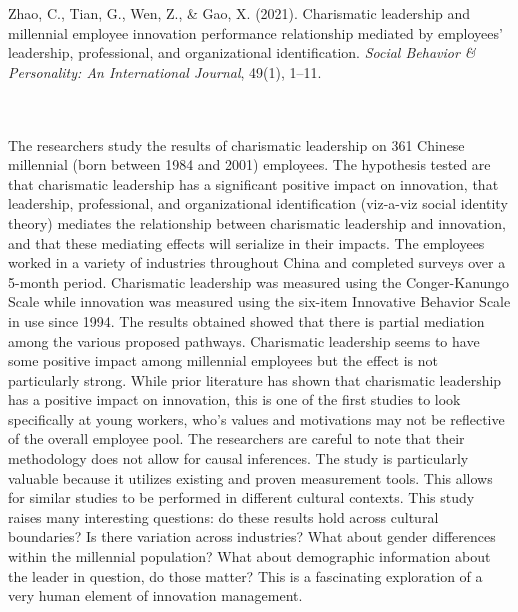 \documentclass{apa7}
\begin{document}
\bigskip
\hfill\begin{minipage}{\dimexpr\textwidth-1in}
  \begin{hangparas}{.25in}{1}
Zhao, C., Tian, G., Wen, Z., \& Gao, X. (2021). Charismatic leadership and millennial employee innovation performance relationship mediated by employees’ leadership, professional, and organizational identification. \textit{Social Behavior \& Personality: An International Journal}, 49(1), 1–11.
\end{hangparas}
\xdef\tpd{\the\prevdepth}
\end{minipage}
\\
\\
The researchers study the results of charismatic leadership on 361 Chinese millennial (born between 1984 and 2001) employees. The hypothesis tested are that charismatic leadership has a significant positive impact on innovation, that leadership, professional, and organizational identification (viz-a-viz social identity theory) mediates the relationship between charismatic leadership and innovation, and that these mediating effects will serialize in their impacts. The employees worked in a variety of industries throughout China and completed surveys over a 5-month period. Charismatic leadership was measured using the Conger-Kanungo Scale while innovation was measured using the six-item Innovative Behavior Scale in use since 1994. The results obtained showed that there is partial mediation among the various proposed pathways. Charismatic leadership seems to have some positive impact among millennial employees but the effect is not particularly strong.  While prior literature has shown that charismatic leadership has a positive impact on innovation, this is one of the first studies to look specifically at young workers, who's values and motivations may not be reflective of the overall employee pool. The researchers are careful to note that their methodology does not allow for causal inferences. The study is particularly valuable because it utilizes existing and proven measurement tools. This allows for similar studies to be performed in different cultural contexts. This study raises many interesting questions: do these results hold across cultural boundaries? Is there variation across industries? What about gender differences within the millennial population? What about demographic information about the leader in question, do those matter? This is a fascinating exploration of a very human element of innovation management.
\end{document}
